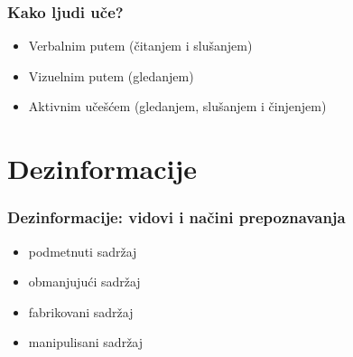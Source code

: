 \documentclass{beamer}
\begin{document}
\begin{frame}[fragile]\frametitle{Kako ljudi uče?}
	\begin{itemize}	
		\item Verbalnim putem (čitanjem i slušanjem)
		\item Vizuelnim putem (gledanjem)
		\item Aktivnim učešćem (gledanjem, slušanjem i činjenjem)
	\end{itemize}
\end{frame}


\section{Dezinformacije}
\begin{frame}[fragile]\frametitle{Dezinformacije: vidovi i načini prepoznavanja}
	\begin{itemize}	
		\item podmetnuti sadržaj
		\item obmanjujući sadržaj
		\item fabrikovani sadržaj
  		\item manipulisani sadržaj
	\end{itemize}
 


\end{frame}
\end{document}
